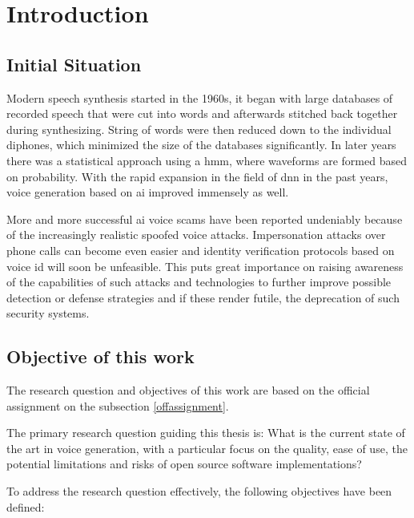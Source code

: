 \newpage
\section{Introduction}

\subsection{Initial Situation}

Modern speech synthesis started in the 1960s, it began with large databases of recorded speech that were cut into words and afterwards stitched back together during synthesizing. String of words were then reduced down to the individual diphones, which minimized the size of the databases significantly. In later years there was a statistical approach using a \gls{hmm}, where waveforms are formed based on probability. With the rapid expansion in the field of \gls{dnn} in the past years, voice generation based on \gls{ai} improved immensely as well\cite{enwiki:1189644011}.

More and more successful \gls{ai} voice scams have been reported undeniably because of the increasingly realistic spoofed voice attacks\cite{cbsnews2023voice}.
Impersonation attacks over phone calls can become even easier and identity verification protocols based on voice id will soon be unfeasible. This puts great importance on raising awareness of the capabilities of such attacks and technologies to further improve possible detection or defense strategies and if these render futile, the deprecation of such security systems\cite{vice2023bank}.

\subsection{Objective of this work}
The research question and objectives of this work are based on the official assignment on the subsection \ref{offassignment}.

The primary research question guiding this thesis is:
What is the current state of the art in voice generation, with a particular focus on the quality, ease of use, the potential limitations and risks of open source software implementations? 

To address the research question effectively, the following objectives have been defined:

